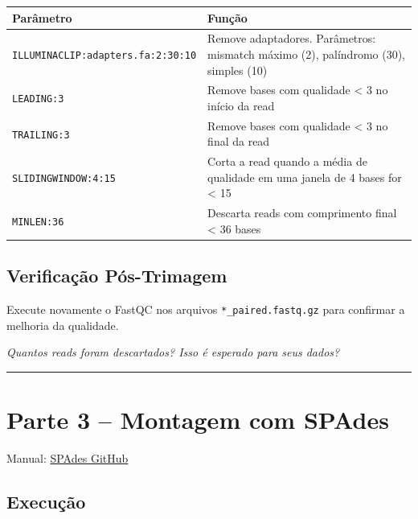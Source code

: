\documentclass[
  brazilian,
  letterpaper,
  DIV=11,
  numbers=noendperiod]{scrartcl}
\newcounter{none} %
\begin{document}
{\def\LTcaptype{none} %
\begin{longtable}[]{@{}
  >{\raggedright\arraybackslash}p{}
  >{\raggedright\arraybackslash}p{}@{}}
\toprule\noalign{}
\begin{minipage}[b]{\linewidth}\raggedright
Parâmetro
\end{minipage} & \begin{minipage}[b]{\linewidth}\raggedright
Função
\end{minipage} \\
\midrule\noalign{}
\endhead
\bottomrule\noalign{}
\endlastfoot
\texttt{ILLUMINACLIP:adapters.fa:2:30:10} & Remove adaptadores.
Parâmetros: mismatch máximo (2), palíndromo (30), simples (10) \\
\texttt{LEADING:3} & Remove bases com qualidade \textless{} 3 no início
da read \\
\texttt{TRAILING:3} & Remove bases com qualidade \textless{} 3 no final
da read \\
\texttt{SLIDINGWINDOW:4:15} & Corta a read quando a média de qualidade
em uma janela de 4 bases for \textless{} 15 \\
\texttt{MINLEN:36} & Descarta reads com comprimento final \textless{} 36
bases \\
\end{longtable}
}

\subsection{Verificação
Pós-Trimagem}\label{verificauxe7uxe3o-puxf3s-trimagem}

Execute novamente o FastQC nos arquivos \texttt{*\_paired.fastq.gz} para
confirmar a melhoria da qualidade.

\emph{Quantos reads foram descartados? Isso é esperado para seus dados?}

\begin{center}\rule{0.5\linewidth}{0.5pt}\end{center}

\section{Parte 3 -- Montagem com
SPAdes}\label{parte-3-montagem-com-spades}

Manual: \href{https://github.com/ablab/spades}{SPAdes GitHub}

\subsection{Execução}\label{execuuxe7uxe3o-1}
\end{document}
